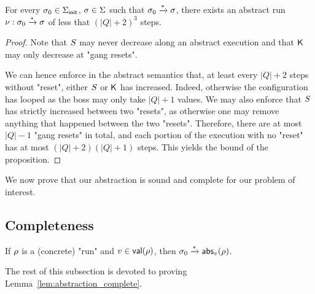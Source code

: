 \begin{lemma}
	\label{lem:short-run}
For every $\sigma_0 \in \Sigma_{\mathsf{init}}$, $\sigma \in \Sigma$ such that $\sigma_0 \xrightarrow{*} \sigma$, there exists an abstract run $\nu: \sigma_0 \xrightarrow{*} \sigma$ of less that $(|Q|+2)^3$ steps.
\end{lemma}
\begin{proof}
Note that $S$ may never decrease along an abstract execution and that $\mathsf{K}$ may only decrease at "gang resets".

We can hence enforce in the abstract semantics that, at least every $|Q|+2$ steps without "reset", either $S$ or $\mathsf{K}$ has increased. Indeed, otherwise the configuration has looped as the boss may only take $|Q| +1$ values. We may also enforce that $S$ has strictly increased between two "resets", as otherwise one may remove anything that happened between the two "resets". Therefore, there are at most $|Q|-1$ "gang resets" in total, and each portion of the execution with no "reset" has at most $(|Q|+2)(|Q|+1)$ steps. This yields the bound of the proposition. 
\end{proof}

We now prove that our abstraction is sound and complete for our problem of interest. 

\subsection{Completeness}

\begin{lemma}
\label{lem:abstraction_complete}
If $\rho$ is a (concrete) "run" and $v \in \mathsf{val}(\rho)$, then $\sigma_0 \xrightarrow{*} \mathsf{abs}_{v}(\rho)$. 
\end{lemma}
The rest of this subsection is devoted to proving Lemma~\ref{lem:abstraction_complete}.


